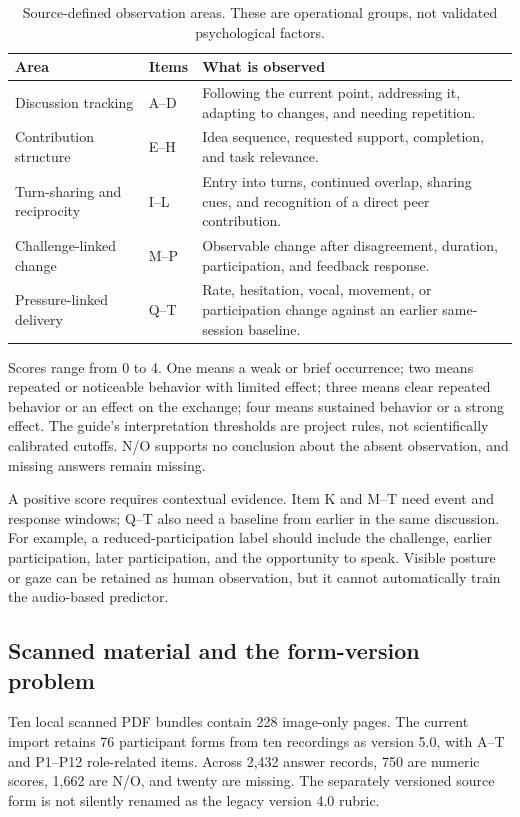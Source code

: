 \documentclass{article}
\begin{document}
\begin{table}[ht]
\caption{Source-defined observation areas. These are operational groups, not validated psychological factors.}
\label{tab:rubric}
\centering\small
\begin{tabularx}{\linewidth}{@{}l l Y@{}}
\toprule Area & Items & What is observed \\
\midrule
Discussion tracking & A--D & Following the current point, addressing it, adapting to changes, and needing repetition. \\
Contribution structure & E--H & Idea sequence, requested support, completion, and task relevance. \\
Turn-sharing and reciprocity & I--L & Entry into turns, continued overlap, sharing cues, and recognition of a direct peer contribution. \\
Challenge-linked change & M--P & Observable change after disagreement, duration, participation, and feedback response. \\
Pressure-linked delivery & Q--T & Rate, hesitation, vocal, movement, or participation change against an earlier same-session baseline. \\
\bottomrule
\end{tabularx}
\end{table}

Scores range from 0 to 4. One means a weak or brief occurrence; two means repeated or noticeable behavior with limited effect; three means clear repeated behavior or an effect on the exchange; four means sustained behavior or a strong effect. The guide's interpretation thresholds are project rules, not scientifically calibrated cutoffs. N/O supports no conclusion about the absent observation, and missing answers remain missing.

A positive score requires contextual evidence. Item K and M--T need event and response windows; Q--T also need a baseline from earlier in the same discussion. For example, a reduced-participation label should include the challenge, earlier participation, later participation, and the opportunity to speak. Visible posture or gaze can be retained as human observation, but it cannot automatically train the audio-based predictor.

\subsection{Scanned material and the form-version problem}
Ten local scanned PDF bundles contain 228 image-only pages. The current import retains 76 participant forms from ten recordings as version 5.0, with A--T and P1--P12 role-related items. Across 2,432 answer records, 750 are numeric scores, 1,662 are N/O, and twenty are missing. The separately versioned source form is not silently renamed as the legacy version 4.0 rubric.
\end{document}
